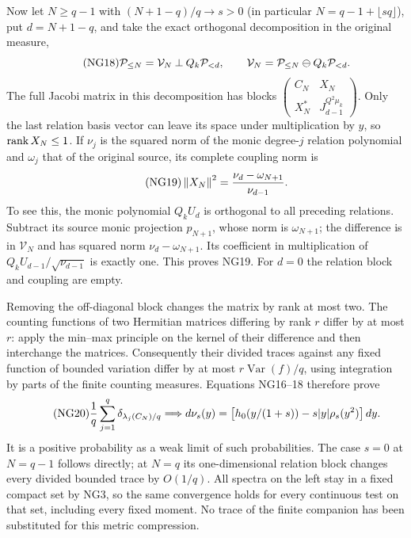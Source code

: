 \documentclass[11pt]{article}
\begin{document}
Now let $N\ge q-1$ with $(N+1-q)/q\to s>0$ (in particular
$N=q-1+\lfloor sq\rfloor$), put $d=N+1-q$, and take the exact
orthogonal decomposition in the original measure,
\begin{equation}\tag{NG18}
 \mathcal P_{\le N}=\mathcal V_N\mathbin{\perp}Q_k\mathcal P_{<d},\qquad
 \mathcal V_N=\mathcal P_{\le N}\ominus Q_k\mathcal P_{<d}.
\end{equation}
The full Jacobi matrix in this decomposition has blocks
$\left(\begin{smallmatrix}C_N&X_N\\X_N^*&J_{d-1}^{Q^2\mu_k}\end{smallmatrix}\right)$.
Only the last relation basis vector can leave its space under
multiplication by $y$, so $\operatorname{rank} X_N\le1$.
If $\nu_j$ is the squared norm of the monic degree-$j$ relation
polynomial and $\omega_j$ that of the original source, its complete
coupling norm is
\begin{equation}\tag{NG19}
 \left\lVert X_N\right\rVert^2=\frac{\nu_d-\omega_{N+1}}{\nu_{d-1}}.
\end{equation}
To see this, the monic polynomial $Q_kU_d$ is orthogonal to all preceding
relations. Subtract its source monic projection $p_{N+1}$, whose norm
is $\omega_{N+1}$; the difference is in $\mathcal V_N$ and has squared
norm $\nu_d-\omega_{N+1}$. Its coefficient in multiplication of
$Q_kU_{d-1}/\sqrt{\nu_{d-1}}$ is exactly one. This proves NG19.
For $d=0$ the relation block and coupling are empty.

Removing the off-diagonal block changes the matrix by rank at most two.
The counting functions of two Hermitian matrices differing by rank $r$
differ by at most $r$: apply the min--max principle on the kernel of
their difference and then interchange the matrices. Consequently their
divided traces against any fixed function of bounded variation differ
by at most $r\operatorname{Var}(f)/q$, using integration by parts of
the finite counting measures. Equations NG16--18 therefore prove
\begin{equation}\tag{NG20}
 \frac1q\sum_{j=1}^q\delta_{\lambda_j(C_N)/q}\Longrightarrow
 d\nu_s(y)=\bigl[h_0(y/(1+s))-s|y|\rho_s(y^2)\bigr]\,d y.
\end{equation}
It is a positive probability as a weak limit of such probabilities.
The case $s=0$ at $N=q-1$ follows directly; at $N=q$ its one-dimensional
relation block changes every divided bounded trace by $O(1/q)$.
All spectra on the left stay in a fixed compact set by NG3, so the
same convergence holds for every continuous test on that set, including
every fixed moment. No trace of the finite companion has been substituted
for this metric compression.
\end{document}
